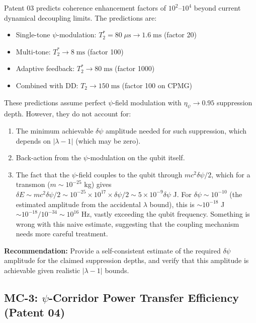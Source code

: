 \documentclass[12pt,a4paper]{article}
\begin{document}
\begin{moderate}
Patent 03 predicts coherence enhancement factors of $10^2$--$10^4$ beyond
current dynamical decoupling limits. The predictions are:
\begin{itemize}[nosep]
\item Single-tone $\psi$-modulation: $T_2^* = 80\;\mu\text{s} \to 1.6\;\text{ms}$
(factor 20)
\item Multi-tone: $T_2^* \to 8\;\text{ms}$ (factor 100)
\item Adaptive feedback: $T_2^* \to 80\;\text{ms}$ (factor 1000)
\item Combined with DD: $T_2 \to 150\;\text{ms}$ (factor 100 on CPMG)
\end{itemize}

These predictions assume perfect $\psi$-field modulation with
$\eta_\psi \to 0.95$ suppression depth. However, they do not account for:
\begin{enumerate}[nosep]
\item The minimum achievable $\delta\psi$ amplitude needed for such
suppression, which depends on $|\lambda - 1|$ (which may be zero).
\item Back-action from the $\psi$-modulation on the qubit itself.
\item The fact that the $\psi$-field couples to the qubit through
$mc^2\delta\psi/2$, which for a transmon ($m \sim 10^{-25}$ kg) gives
$\delta E \sim mc^2\delta\psi/2 \sim 10^{-25}\times 10^{17}\times\delta\psi/2
\sim 5\times 10^{-9}\delta\psi$ J. For $\delta\psi \sim 10^{-10}$
(the estimated amplitude from the accidental $\lambda$ bound), this is
$\sim 10^{-18}$ J $\sim 10^{-18}/10^{-34} \sim 10^{16}$ Hz, vastly
exceeding the qubit frequency. Something is wrong with this naive estimate,
suggesting that the coupling mechanism needs more careful treatment.
\end{enumerate}

\textbf{Recommendation:} Provide a self-consistent estimate of the required
$\delta\psi$ amplitude for the claimed suppression depths, and verify that
this amplitude is achievable given realistic $|\lambda - 1|$ bounds.
\end{moderate}

\subsection{MC-3: $\psi$-Corridor Power Transfer Efficiency (Patent 04)}
\end{document}
